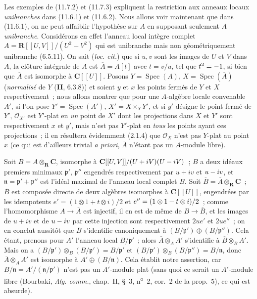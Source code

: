 \begin{env}[11.7.5]
Les exemples de (11.7.2) et (11.7.3) expliquent la restriction aux anneaux
locaux \emph{unibranches} dans (11.6.1) et (11.6.2). Nous allons voir maintenant
que dans (11.6.1), on ne peut affaiblir l'hypothèse sur $A$ en supposant
seulement $A$ \emph{unibranche}. Considérons en effet l'anneau local intègre complet
$A=\mathbf R[[U,V]]/(U^2+V^2)$ qui est unibranche mais non géométriquement
unibranche (6.5.11). On sait (\emph{loc. cit.}) que si $u,v$ sont les images de
$U$ et $V$ dans $A$, la clôture intégrale de $A$ est $\overline A=A[t]$ avec
$t=v/u$, tel que $t^2=- 1$, si bien que $\overline A$ est isomorphe à
$\mathbf C[[U]]$. Posons $Y=\operatorname{Spec}(A)$,
$X=\operatorname{Spec}(\overline A)$ (\emph{normalisé} de $Y$ (\textbf{II}, 6.3.8)) et
soient $y$ et $x$ les points fermés de $Y$ et $X$ respectivement~; nous allons
montrer que pour une $A$-algèbre locale convenable $A'$, si l'on pose
$Y'=\operatorname{Spec}(A')$, $X'=X\times_Y Y'$, et si $y'$ désigne le point
fermé de $Y'$, $\mathcal O_{X'}$ est $Y'$-plat en \emph{un} point de $X'$ dont les
projections dans $X$ et $Y'$ sont respectivement $x$ et $y'$, mais n'est pas
$Y'$-plat en \emph{tous} les points ayant ces projections~; il en résultera évidemment
(2.1.4) que $\mathcal O_X$ n'est pas $Y$-plat au point $x$ (ce qui est d'ailleurs
trivial \emph{a priori}, $\overline A$ n'étant pas un $A$-module libre).

Soit $B=A\otimes_{\mathbf R}\mathbf C$, isomorphe à
$\mathbf C[[U,V]]/(U+iV)(U- iV)$~; $B$ a deux idéaux premiers minimaux
$\mathfrak p'$, $\mathfrak p''$ engendrés respectivement par $u+iv$ et $u- iv$,
et $\mathfrak n=\mathfrak p'+\mathfrak p''$ est l'idéal maximal de l'anneau
local complet $B$. Soit $\overline B=\overline A\otimes_{\mathbf R}\mathbf C$~;
$\overline B$ est composée directe de deux algèbres isomorphes à
$\mathbf C[[U]]$, engendrées par les idempotents
$e'=(1\otimes1+t\otimes i)/2$ et $e''=(1\otimes1- t\otimes i)/2$~; comme
l'homomorphisme $A\to\overline A$ est injectif, il en est de même de
$B\to\overline B$, et les images de $u+iv$ et de $u- iv$ par cette injection sont
respectivement $2ue'$ et $2ue''$~; on en conclut aussitôt que $\overline B$
s'identifie canoniquement à $(B/\mathfrak p')\oplus(B/\mathfrak p'')$. Cela
étant, prenons pour $A'$ l'anneau local $B/\mathfrak p'$~; alors
$\overline A\otimes_A A'$ s'identifie à $\overline B\otimes_B A'$. Mais on a
$(B/\mathfrak p')\otimes_B(B/\mathfrak p')=B/\mathfrak p'$ et
$(B/\mathfrak p')\otimes_B(B/\mathfrak p'')=B/\mathfrak n$, donc
$\overline A\otimes_A A'$ est isomorphe à $A'\oplus(B/\mathfrak n)$. Cela
établit notre assertion, car $B/\mathfrak n=A'/(\mathfrak n/\mathfrak p')$
n'est pas un $A'$-module plat (sans quoi ce serait un $A'$-module libre
(Bourbaki, \emph{Alg. comm.}, chap.~II, \S~3, n\textsuperscript{o}~2, cor.~2 de la
prop.~5), ce qui est absurde).
\end{env}

